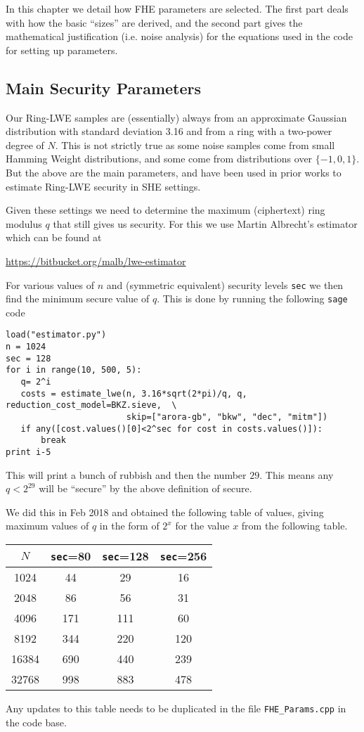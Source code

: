 \label{sec:fhe}
In this chapter we detail how FHE parameters are selected.
The first part deals with how the basic ``sizes'' are derived,
and the second part gives the mathematical justification (i.e.
noise analysis) for the equations used in the code for setting
up parameters.


\subsection{Main Security Parameters}
Our Ring-LWE samples are (essentially) always from an
approximate Gaussian distribution with standard deviation 3.16
and from a ring with a two-power degree of $N$.
This is not strictly true as some noise samples come
from small Hamming Weight distributions, and some come
from distributions over $\{-1,0,1\}$. 
But the above are the main parameters, and have been used in prior works to
estimate Ring-LWE security in SHE settings.

Given these settings we need to determine the maximum 
(ciphertext) ring modulus $q$ that still gives us security.
For this we use Martin Albrecht's estimator which can
be found at
\begin{center}
\url{https://bitbucket.org/malb/lwe-estimator}
\end{center}
For various values of $n$ and (symmetric equivalent)
security levels \verb+sec+ we then find the minimum secure
value of $q$.
This is done by running the following \verb+sage+ code
\begin{verbatim}
load("estimator.py")
n = 1024
sec = 128
for i in range(10, 500, 5):
   q= 2^i
   costs = estimate_lwe(n, 3.16*sqrt(2*pi)/q, q, reduction_cost_model=BKZ.sieve,  \
                        skip=["arora-gb", "bkw", "dec", "mitm"])
   if any([cost.values()[0]<2^sec for cost in costs.values()]):
       break
print i-5
\end{verbatim}
This will print a bunch of rubbish and then the number $29$. 
This means any $q < 2^{29}$ will be ``secure'' by the above definition of secure.

We did this in Feb 2018 and obtained the following table of values, giving maximum
values of $q$ in the form of $2^x$ for the value $x$ from the following table.
\begin{center}
\begin{tabular}{|c|c|c|c|}
\hline
$N$   & \verb+sec+=80 & \verb+sec+=128 & \verb+sec+=256 \\
\hline
1024  &  44 &    29        & 16 \\
2048  &  86 &    56        & 31 \\
4096  & 171 &   111        & 60 \\
8192  & 344 &   220        & 120 \\
16384 & 690 &   440        & 239 \\
32768 & 998 &   883        & 478 \\
\hline
\end{tabular}
\end{center}
Any updates to this table needs to be duplicated in 
the file \verb+FHE_Params.cpp+ in the code base.

